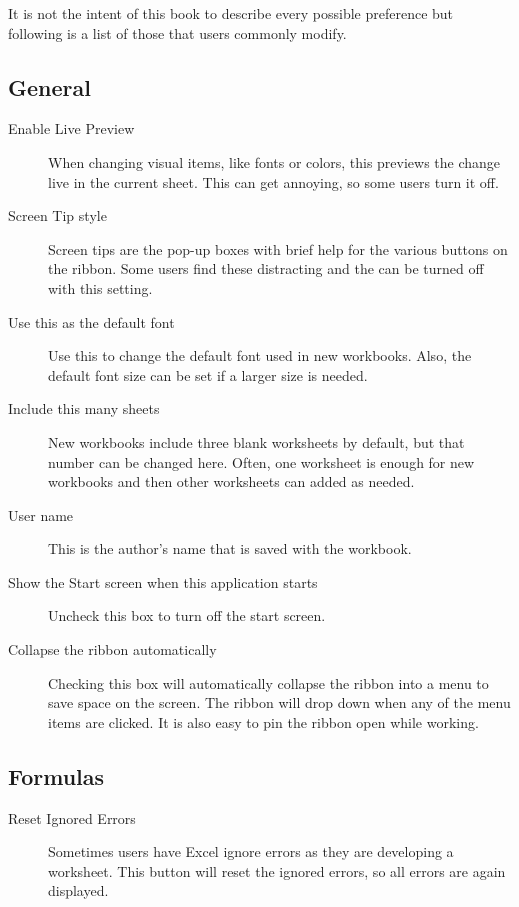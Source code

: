 It is not the intent of this book to describe every possible preference but following is a list of those that users commonly modify.

\subsection{General}

\begin{description}
	\item[Enable Live Preview] When changing visual items, like fonts or colors, this previews the change live in the current sheet. This can get annoying, so some users turn it off.
	\item[Screen Tip style] Screen tips are the pop-up boxes with brief help for the various buttons on the ribbon. Some users find these distracting and the can be turned off with this setting.
	\item[Use this as the default font] Use this to change the default font used in new workbooks. Also, the default font size can be set if a larger size is needed.
	\item[Include this many sheets] New workbooks include three blank worksheets by default, but that number can be changed here. Often, one worksheet is enough for new workbooks and then other worksheets can added as needed.
	\item[User name] This is the author's name that is saved with the workbook.
	\item[Show the Start screen when this application starts] Uncheck this box to turn off the start screen.
	\item[Collapse the ribbon automatically] Checking this box will automatically collapse the ribbon into a menu to save space on the screen. The ribbon will drop down when any of the menu items are clicked. It is also easy to pin the ribbon open while working.
\end{description}

\subsection{Formulas}

\begin{description}
	\item[Reset Ignored Errors] Sometimes users have Excel ignore errors as they are developing a worksheet. This button will reset the ignored errors, so all errors are again displayed.
\end{description}

